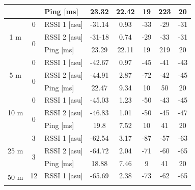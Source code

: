 \begin{table}[H]
\begin{tabular}{|c|c|l|c|c|c|c|c|}
        && Ping [ms] & 23.32 & 22.42 & 19 & 223 & 20 \\\hline\hline
        \multirow{3}{*}{1 m} & \multirow{1}{*}{0} & RSSI 1 [asu] & -31.14 & 0.93 & -33 & -29 & -31 \\\cline{2-8}\cline{2-8}
        & \multirow{2}{*}{0} & RSSI 2 [asu] & -31-18 & 0.74 & -29 & -33 & -31 \\\cline{3-8}
        && Ping [ms] & 23.29 & 22.11 & 19 & 219 & 20 \\\hline\hline
        \multirow{3}{*}{5 m} & \multirow{1}{*}{0} & RSSI 1 [asu] & -42.67 & 0.97 & -45 & -41 & -43 \\\cline{2-8}\cline{2-8}
        & \multirow{2}{*}{0} & RSSI 2 [asu] & -44.91 & 2.87 & -72 & -42 & -45 \\\cline{3-8}
        && Ping [ms] & 22.47 & 9.34 & 10 & 50 & 20 \\\hline\hline
        \multirow{3}{*}{10 m} & \multirow{1}{*}{0} & RSSI 1 [asu] & -45.03 & 1.23 & -50 & -43 & -45 \\\cline{2-8}\cline{2-8}
        & \multirow{2}{*}{0} & RSSI 2 [asu] & -46.83 & 1.01 & -50 & -45 & -47 \\\cline{3-8}
        && Ping [ms] & 19.8 & 7.52 & 10 & 41 & 20 \\\hline\hline
        \multirow{3}{*}{25 m} & \multirow{1}{*}{3} & RSSI 1 [asu] & -62.54 & 3.17 & -87 & -57 & -63 \\\cline{2-8}\cline{2-8}
        & \multirow{2}{*}{3} & RSSI 2 [asu] & -64.72 & 2.04 & -71 & -60 & -65 \\\cline{3-8}
        && Ping [ms] & 18.88 & 7.46 & 9 & 41 & 20 \\\hline\hline
        \multirow{3}{*}{50 m} & \multirow{1}{*}{12} & RSSI 1 [asu] & -65.69 & 2.38 & -73 & -62 & -65 \\\cline{2-8}\cline{2-8}

\end{tabular}
\end{table}
